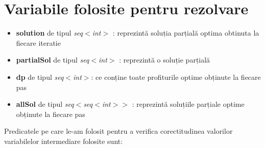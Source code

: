 \section{Variabile folosite pentru rezolvare}
\begin{itemize}
    \item \textbf{solution} de tipul \textit{seq$<$int$>$} : reprezintă soluția parțială optima obtinuta la fiecare iteratie
    \item \textbf{partialSol} de tipul \textit{seq$<$int$>$} : reprezintă o soluție parțială
    \item \textbf{dp} de tipul \textit{seq$<$int$>$}:
    ce conține toate profiturile optime obținute la fiecare pas
    \item \textbf{allSol} de tipul \textit{seq$<$seq$<$int$>$$>$} : reprezintă soluțiile parțiale optime obținute la fiecare pas
   
\end{itemize}

Predicatele pe care le-am folosit pentru a verifica corectitudinea valorilor variabilelor intermediare folosite sunt: 

